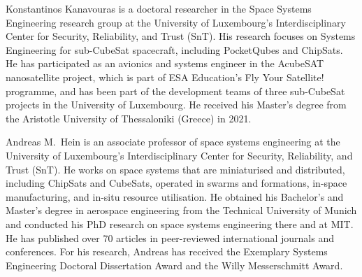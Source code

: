 \documentclass[journal,10pt]{IEEEtran}
\begin{document}
{}
\printacronyms[template=supertabular]
\printbibliography

\begin{IEEEbiography}{Konstantinos Kanavouras}
	is a doctoral researcher in the Space Systems Engineering research group at the University of Luxembourg's Interdisciplinary Center for Security, Reliability, and Trust (SnT). His research focuses on Systems Engineering for sub-CubeSat spacecraft, including PocketQubes and ChipSats. He has participated as an avionics and systems engineer in the AcubeSAT nanosatellite project, which is part of ESA Education’s Fly Your Satellite! programme, and has been part of the development teams of three sub-CubeSat projects in the University of Luxembourg. He received his Master's degree from the Aristotle University of Thessaloniki (Greece) in 2021.
\end{IEEEbiography}

\begin{IEEEbiography}{Andreas M.\ Hein}
	is an associate professor of space systems engineering at the University of Luxembourg's Interdisciplinary Center for Security, Reliability, and Trust (SnT). He works on space systems that are miniaturised and distributed, including ChipSats and CubeSats, operated in swarms and formations, in-space manufacturing, and in-situ resource utilisation. He obtained his Bachelor's and Master's degree in aerospace engineering from the Technical University of Munich and conducted his PhD research on space systems engineering there and at MIT. He has published over 70 articles in peer-reviewed international journals and conferences. For his research, Andreas has received the Exemplary Systems Engineering Doctoral Dissertation Award and the Willy Messerschmitt Award.
\end{IEEEbiography}


\end{document}
